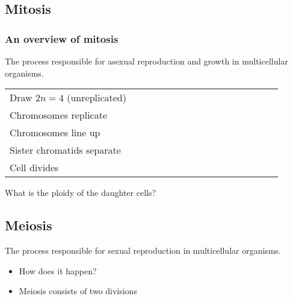 \subsection{Mitosis}

\begin{frame}[t]
    \frametitle{An overview of mitosis}
        \vspace{-3mm}
         The process responsible for asexual reproduction and
            growth in multicellular organisms. 
    \begin{adjustwidth}{-3em}{-3em}

    \vspace{1mm}
    \begin{table}%
        \centering
        \begin{tabular}{ p{0.45\linewidth} p{0.45\linewidth} }
            Draw $2n=4$ (unreplicated) & \\[5ex]
            Chromosomes replicate & \\[5ex]
            Chromosomes line up & \\[5ex]
            Sister chromatids separate & \\[5ex]
            Cell divides & \\
        \end{tabular}
    \end{table}
    \end{adjustwidth}
    What is the ploidy of the daughter cells? 
\end{frame}


\subsection{Meiosis}

\begin{frame}
     The process responsible for sexual reproduction in
    multicellular organisms.

    \vspace{4mm}
    \begin{itemize}
        \item How does it happen?

        \vspace{4mm}
        \item {} Meiosis consists of two divisions
    \end{itemize}
\end{frame}

